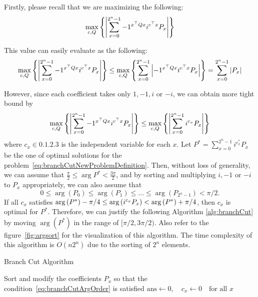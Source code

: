\documentclass[\main/main]{subfiles}
\begin{document}
Firstly, please recall that we are maximizing the following:
\begin{equation*}
  \max_{c,Q} \qty{ \abs{\sum_{x=0}^{2^n-1} -1^{x^\top Q x} i^{c^\top x} P_x} }
\end{equation*}

This value can easily evaluate as the following:
\begin{equation*}
  \max_{c,Q} \qty{ \abs{\sum_{x=0}^{2^n-1} -1^{x^\top Q x} i^{c^\top x} P_x} }
  \leq \max_{c,Q} \qty{ \sum_{x=0}^{2^n-1} \abs{-1^{x^\top Q x} i^{c^\top x} P_x} }
  = \sum_{x=0}^{2^n-1} \abs{P_x}
\end{equation*}

However, since each coefficient takes only $1, -1, i$ or $-i$,
we can obtain more tight bound by
\begin{equation}\label{eq:branchCutNewProblemDefinition}
  \max_{c,Q} \qty{ \abs{\sum_{x=0}^{2^n-1} -1^{x^\top Q x} i^{c^\top x} P_x} }
  \leq \max_{c,Q} \qty{ \abs{\sum_{x=0}^{2^n-1} i^{c_x} P_x} }
\end{equation}
where $c_x \in \qty{0, 1, 2, 3}$ is the independent variable for each $x$.
Let $P^* = \sum_{x=0}^{2^n-1} i^{c_x^*} P_x$ be
the one of optimal solutions for the problem~\eqref{eq:branchCutNewProblemDefinition}.
Then, without loss of generality,
we can assume that $\frac{\pi}{2} \leq \arg P^* < \frac{3\pi}{2}$,
and by sorting and multiplying $i,-1$ or $-i$ to $P_x$ appropriately,
we can also assume that
\begin{equation}\label{eq:branchCutArgOrder}
  0 \leq \arg{(P_0)} \leq \arg{(P_1)} \leq \dots \leq \arg{(P_{2^n-1})} < \pi/2.
\end{equation}
If all $c_x$ satisfies $\arg{(P^*)} - \pi/4 \leq \arg{\qty(i^{c_x} P_x)} < \arg{(P^*)} + \pi/4$,
then $c_x$ is optimal for $P^*$.
Therefore, we can justify the following Algorithm \ref{alg:branchCut}
by moving $\arg(P^*)$ in the range of $[\pi/2, 3\pi/2)$.
Also refer to the figure~\ref{fig:argsort} for the visualization of this algorithm.
The time complexity of this algorithm is $O(n2^n)$
due to the sorting of $2^n$ elements.

\begin{algorithm}
  \caption{Branch Cut Algorithm}
  \label{alg:branchCut}
  Sort and modify the coefficients $P_x$ so that the condition~\eqref{eq:branchCutArgOrder} is satisfied\;
  $\mathrm{ans} \leftarrow 0, \quad c_x \leftarrow 0 \quad \text{for all } x$\;
\end{algorithm}
\end{document}
